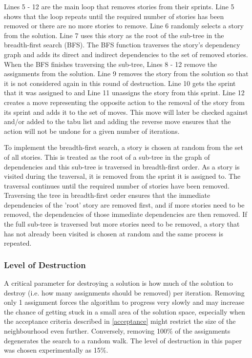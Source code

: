 Lines 5 - 12 are the main loop that removes stories from their sprints. Line 5 shows that the loop repeats until the required number of stories has been removed or there are no more stories to remove. Line 6 randomly selects a story from the solution. Line 7 uses this story as the root of the sub-tree in the breadth-first search (BFS). The BFS function traverses the story's dependency graph and adds its direct and indirect dependencies to the set of removed stories. When the BFS finishes traversing the sub-tree, Lines 8 - 12 remove the assignments from the solution. Line 9 removes the story from the solution so that it is not considered again in this round of destruction. Line 10 gets the sprint that it was assigned to and Line 11 unassigns the story from this sprint. Line 12 creates a move representing the opposite action to the removal of the story from its sprint and adds it to the set of moves. This move will later be checked against and/or added to the tabu list and adding the reverse move ensures that the action will not be undone for a given number of iterations.

To implement the breadth-first search, a story is chosen at random from the set of all stories. This is treated as the root of a sub-tree in the graph of dependencies and this sub-tree is traversed in breadth-first order. As a story is visited during the traversal, it is removed from the sprint it is assigned to. The traversal continues until the required number of stories have been removed. Traversing the tree in breadth-first order ensures that the immediate dependencies of the 'root' story are removed first, and if more stories need to be removed, the dependencies of those immediate dependencies are then removed. If the full sub-tree is traversed but more stories need to be removed, a story that has not already been visited is chosen at random and the same process is repeated.

\subsubsection{Level of Destruction}

A critical parameter for destroying a solution is how much of the solution to destroy (i.e. how many assignments should be removed) per iteration. Removing only 1 assignment forces the algorithm to progress very slowly and may increase the chance of getting stuck in a small area of the solution space, especially when the acceptance criteria described in \cref{acceptance} might restrict the size of the neighbourhood even further. Conversely, removing 100\% of the assignments degenerates the search to a random walk. The level of destruction in this paper was chosen experimentally as 15\%.


